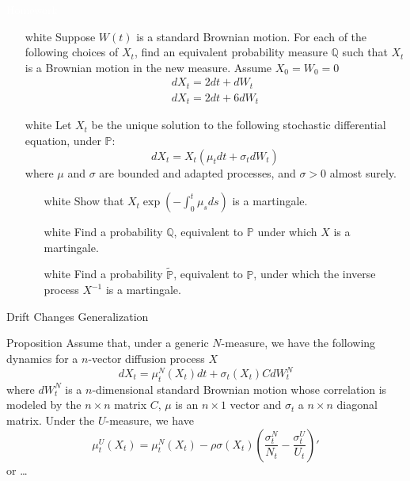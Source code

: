 \documentclass{beamer}
\begin{document}
\begin{homework}
	\begin{frame}{\textcolor{white}{Homework}}
		\begin{itemize}
			\item[white] Suppose $W(t)$ is a standard Brownian motion. For each of the following choices of $X_t$, find an equivalent probability measure $\mathbb{Q}$ such that $X_t$ is a Brownian motion in the new measure. Assume $X_0=W_0=0$
			\begin{equation*}
				\begin{gathered}
					dX_t = 2dt + dW_t\\
					dX_t = 2dt + 6dW_t
				\end{gathered}
			\end{equation*}
			\item[white] Let $X_t$ be the unique solution to the following stochastic differential equation, under $\mathbb{P}$:
			\begin{equation*}
				dX_t = X_t(\mu_t dt + \sigma_t dW_t)
			\end{equation*}
			where $\mu$ and $\sigma$ are bounded and adapted processes, and $\sigma >0$ almost surely.
			\begin{itemize}
				\item[white] Show that $X_t\exp(-\int_0^t \mu_s ds)$ is a martingale.
				\item[white] Find a probability $\mathbb{Q}$, equivalent to $\mathbb{P}$ under which $X$ is a martingale.
				\item[white] Find a probability $\tilde{\mathbb{P}}$, equivalent to $\mathbb{P}$, under which the inverse process $X^{-1}$ is a martingale.
			\end{itemize}
		\end{itemize}
	\end{frame}
\end{homework}

\begin{frame}{Drift Changes Generalization}
  \begin{block}{Proposition}
    Assume that, under a generic $N$-measure, we have the following dynamics for a $n$-vector diffusion process $X$
    \begin{equation*}
      dX_t = \mu_t^N(X_t)dt + \sigma_t(X_t)CdW^N_t
    \end{equation*}
    where $dW^N_t$ is a $n$-dimensional standard Brownian motion whose correlation is modeled by the $n\times n$ matrix $C$, $\mu$ is an $n\times 1$ vector and $\sigma_t$ a $n\times n$ diagonal matrix. Under the $U$-measure, we have
    \begin{equation}
      \mu^U_t(X_t) = \mu^N_t(X_t) - \rho\sigma(X_t)\left(\frac{\sigma^N_t}{N_t}-\frac{\sigma^U_t}{U_t}\right)'
    \end{equation}
	or \ldots
	\end{block}
\end{frame}
\end{document}
